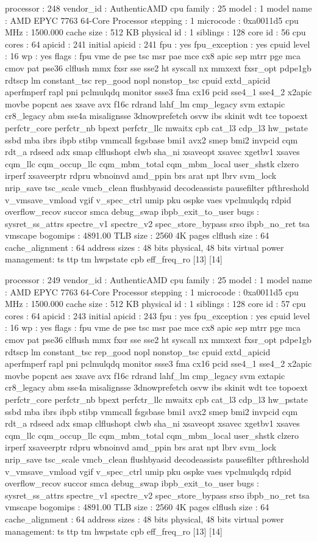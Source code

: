 processor	: 248
vendor_id	: AuthenticAMD
cpu family	: 25
model		: 1
model name	: AMD EPYC 7763 64-Core Processor
stepping	: 1
microcode	: 0xa0011d5
cpu MHz		: 1500.000
cache size	: 512 KB
physical id	: 1
siblings	: 128
core id		: 56
cpu cores	: 64
apicid		: 241
initial apicid	: 241
fpu		: yes
fpu_exception	: yes
cpuid level	: 16
wp		: yes
flags		: fpu vme de pse tsc msr pae mce cx8 apic sep mtrr pge mca cmov pat pse36 clflush mmx fxsr sse sse2 ht syscall nx mmxext fxsr_opt pdpe1gb rdtscp lm constant_tsc rep_good nopl nonstop_tsc cpuid extd_apicid aperfmperf rapl pni pclmulqdq monitor ssse3 fma cx16 pcid sse4_1 sse4_2 x2apic movbe popcnt aes xsave avx f16c rdrand lahf_lm cmp_legacy svm extapic cr8_legacy abm sse4a misalignsse 3dnowprefetch osvw ibs skinit wdt tce topoext perfctr_core perfctr_nb bpext perfctr_llc mwaitx cpb cat_l3 cdp_l3 hw_pstate ssbd mba ibrs ibpb stibp vmmcall fsgsbase bmi1 avx2 smep bmi2 invpcid cqm rdt_a rdseed adx smap clflushopt clwb sha_ni xsaveopt xsavec xgetbv1 xsaves cqm_llc cqm_occup_llc cqm_mbm_total cqm_mbm_local user_shstk clzero irperf xsaveerptr rdpru wbnoinvd amd_ppin brs arat npt lbrv svm_lock nrip_save tsc_scale vmcb_clean flushbyasid decodeassists pausefilter pfthreshold v_vmsave_vmload vgif v_spec_ctrl umip pku ospke vaes vpclmulqdq rdpid overflow_recov succor smca debug_swap ibpb_exit_to_user
bugs		: sysret_ss_attrs spectre_v1 spectre_v2 spec_store_bypass srso ibpb_no_ret tsa vmscape
bogomips	: 4891.00
TLB size	: 2560 4K pages
clflush size	: 64
cache_alignment	: 64
address sizes	: 48 bits physical, 48 bits virtual
power management: ts ttp tm hwpstate cpb eff_freq_ro [13] [14]

processor	: 249
vendor_id	: AuthenticAMD
cpu family	: 25
model		: 1
model name	: AMD EPYC 7763 64-Core Processor
stepping	: 1
microcode	: 0xa0011d5
cpu MHz		: 1500.000
cache size	: 512 KB
physical id	: 1
siblings	: 128
core id		: 57
cpu cores	: 64
apicid		: 243
initial apicid	: 243
fpu		: yes
fpu_exception	: yes
cpuid level	: 16
wp		: yes
flags		: fpu vme de pse tsc msr pae mce cx8 apic sep mtrr pge mca cmov pat pse36 clflush mmx fxsr sse sse2 ht syscall nx mmxext fxsr_opt pdpe1gb rdtscp lm constant_tsc rep_good nopl nonstop_tsc cpuid extd_apicid aperfmperf rapl pni pclmulqdq monitor ssse3 fma cx16 pcid sse4_1 sse4_2 x2apic movbe popcnt aes xsave avx f16c rdrand lahf_lm cmp_legacy svm extapic cr8_legacy abm sse4a misalignsse 3dnowprefetch osvw ibs skinit wdt tce topoext perfctr_core perfctr_nb bpext perfctr_llc mwaitx cpb cat_l3 cdp_l3 hw_pstate ssbd mba ibrs ibpb stibp vmmcall fsgsbase bmi1 avx2 smep bmi2 invpcid cqm rdt_a rdseed adx smap clflushopt clwb sha_ni xsaveopt xsavec xgetbv1 xsaves cqm_llc cqm_occup_llc cqm_mbm_total cqm_mbm_local user_shstk clzero irperf xsaveerptr rdpru wbnoinvd amd_ppin brs arat npt lbrv svm_lock nrip_save tsc_scale vmcb_clean flushbyasid decodeassists pausefilter pfthreshold v_vmsave_vmload vgif v_spec_ctrl umip pku ospke vaes vpclmulqdq rdpid overflow_recov succor smca debug_swap ibpb_exit_to_user
bugs		: sysret_ss_attrs spectre_v1 spectre_v2 spec_store_bypass srso ibpb_no_ret tsa vmscape
bogomips	: 4891.00
TLB size	: 2560 4K pages
clflush size	: 64
cache_alignment	: 64
address sizes	: 48 bits physical, 48 bits virtual
power management: ts ttp tm hwpstate cpb eff_freq_ro [13] [14]


